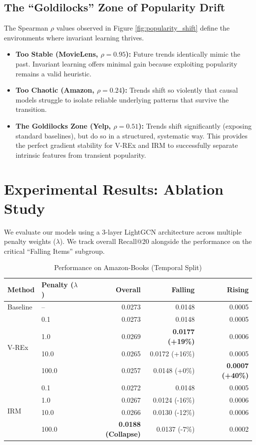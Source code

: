 \documentclass{article}
\begin{document}
\subsection{The ``Goldilocks'' Zone of Popularity Drift}
The Spearman $\rho$ values observed in Figure \ref{fig:popularity_shift} define the environments where invariant learning thrives. 
\begin{itemize}
    \item \textbf{Too Stable (MovieLens, $\rho = 0.95$):} Future trends identically mimic the past. Invariant learning offers minimal gain because exploiting popularity remains a valid heuristic.
    \item \textbf{Too Chaotic (Amazon, $\rho = 0.24$):} Trends shift so violently that causal models struggle to isolate reliable underlying patterns that survive the transition. 
    \item \textbf{The Goldilocks Zone (Yelp, $\rho = 0.51$):} Trends shift significantly (exposing standard baselines), but do so in a structured, systematic way. This provides the perfect gradient stability for V-REx and IRM to successfully separate intrinsic features from transient popularity.
\end{itemize}

\section{Experimental Results: Ablation Study}
We evaluate our models using a 3-layer LightGCN architecture across multiple penalty weights ($\lambda$). We track overall Recall@20 alongside the performance on the critical ``Falling Items'' subgroup.

\begin{table}[h!]
    \centering
    \caption{Performance on Amazon-Books (Temporal Split)}
    \label{tab:amazon_ablation}
    \begin{tabular}{llrrr}
        \toprule
        \textbf{Method} & \textbf{Penalty ($\lambda$)} & \textbf{Overall} & \textbf{Falling} & \textbf{Rising} \\
        \midrule
        Baseline & -- & 0.0273 & 0.0148 & 0.0005 \\
        \midrule
        \multirow{4}{*}{V-REx}
        & 0.1 & 0.0273 & 0.0148 & 0.0005 \\
        & 1.0 & 0.0269 & \textbf{0.0177 (+19\%)} & 0.0006 \\
        & 10.0 & 0.0265 & 0.0172 (+16\%) & 0.0005 \\
        & 100.0 & 0.0257 & 0.0148 (+0\%) & \textbf{0.0007 (+40\%)} \\
        \midrule
        \multirow{4}{*}{IRM}
        & 0.1 & 0.0272 & 0.0148 & 0.0005 \\
        & 1.0 & 0.0267 & 0.0124 (-16\%) & 0.0006 \\
        & 10.0 & 0.0266 & 0.0130 (-12\%) & 0.0006 \\
        & 100.0 & \textbf{0.0188 (Collapse)} & 0.0137 (-7\%) & 0.0002 \\
        \bottomrule
    \end{tabular}
\end{table}
\end{document}
